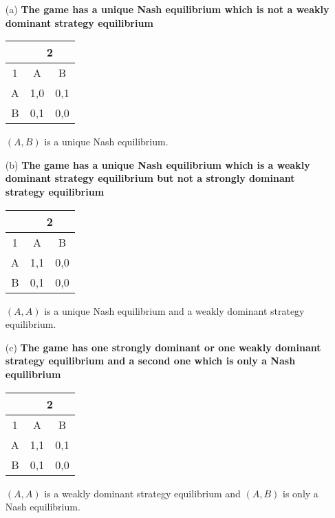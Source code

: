 \begin{enumerate}
    \item[(a)] \textbf{The game has a unique Nash equilibrium which is not a weakly dominant strategy equilibrium}

    \begin{table}[H]
        \centering
        \begin{tabular}{|c|c|c|} \hline
              & \multicolumn{2}{|c|}{2} \\ \hline
            1 & A & B \\ \hline
            A & 1,0 & 0,1 \\ \hline
            B & 0,1 & 0,0 \\ \hline
        \end{tabular}
    \end{table}
    
    $(A,B)$ is a unique Nash equilibrium.
    
    \item[(b)] \textbf{The game has a unique Nash equilibrium which is a weakly dominant strategy equilibrium but not a strongly dominant strategy equilibrium}

    \begin{table}[H]
        \centering
        \begin{tabular}{|c|c|c|} \hline
              & \multicolumn{2}{|c|}{2} \\ \hline
            1 & A & B \\ \hline
            A & 1,1 & 0,0 \\ \hline
            B & 0,1 & 0,0 \\ \hline
        \end{tabular}
    \end{table}
    
    $(A,A)$ is a unique Nash equilibrium and a weakly dominant strategy equilibrium.
    
    \item[(c)] \textbf{The game has one strongly dominant or one weakly dominant strategy equilibrium and a second one which is only a Nash equilibrium}

    \begin{table}[H]
        \centering
        \begin{tabular}{|c|c|c|} \hline
              & \multicolumn{2}{|c|}{2} \\ \hline
            1 & A & B \\ \hline
            A & 1,1 & 0,1 \\ \hline
            B & 0,1 & 0,0 \\ \hline
        \end{tabular}
    \end{table}
    
    $(A,A)$ is a weakly dominant strategy equilibrium and $(A,B)$ is only a Nash equilibrium.
    
\end{enumerate}

